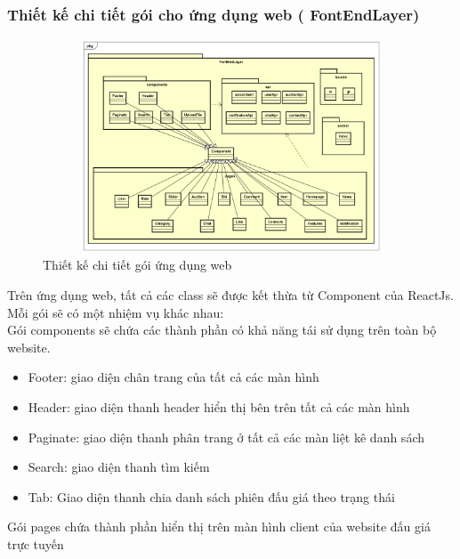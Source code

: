 \documentclass[../DoAn.tex]{subfiles}
\begin{document}
\subsubsection{Thiết kế chi tiết gói cho ứng dụng web ( FontEndLayer)
} \mbox{}
\begin{figure}[H]
    \centering
    \includegraphics[width=11.4cm,height=6.34cm]{Hinhve/fontendlayer.png}
    \caption{Thiết kế chi tiết gói ứng dụng web}
    \label{fig:Fig44}
\end{figure}
Trên ứng dụng web, tất cả các class sẽ được kết thừa từ Component của ReactJs.\\
Mỗi gói sẽ có một nhiệm vụ khác nhau: \\
Gói components sẽ chứa các thành phần có khả năng tái sử dụng trên toàn bộ website.
\begin{itemize}
    \item Footer: giao diện chân trang của tất cả các màn hình
    \item Header: giao diện thanh header hiển thị bên trên tất cả các màn hình
    \item Paginate: giao diện thanh phân trang ở tất cả các màn liệt kê danh sách
    \item Search: giao diện thanh tìm kiếm
    \item Tab: Giao diện thanh chia danh sách phiên đấu giá theo trạng thái
\end{itemize}
Gói pages chứa thành phần hiển thị trên màn hình client của website đấu giá trực tuyến
\end{document}
